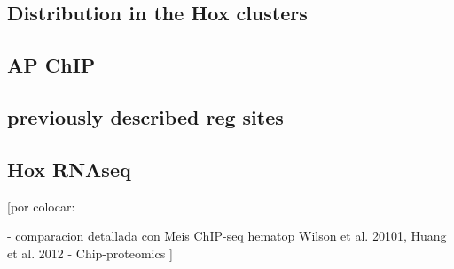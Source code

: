 \subsection{Distribution in the Hox clusters}

\subsection{AP ChIP}

\subsection{previously described reg sites}

\subsection{Hox RNAseq}


[por colocar:

- comparacion detallada con Meis ChIP-seq hematop {Wilson et al. 20101, Huang et al. 2012}
- Chip-proteomics
]
